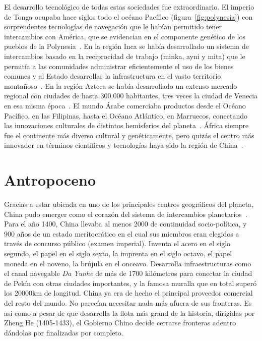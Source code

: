 \documentclass[a4paper,10pt]{book}
\theoremstyle{definition}
\begin{document}
El desarrollo tecnológico de todas estas sociedades fue extraordinario. 
El imperio de Tonga ocupaba hace siglos todo el oc\'eano Pac\'ifico (figura~\ref{fig:polynesia}) con sorprendentes tecnologías de navegación que le habían permitido tener intercambios con América, que se evidencian en el componente genético de los pueblos de la Polynesia~\cite{thorsby2016-polynesiaAmerica, ioannidis2020-polynesiaAmerica}.
En la región Inca se había desarrollado un sistema de intercambios basado en la reciprocidad de trabajo (minka, ayni y mita) que le permitía a las comunidades administrar eficientemente el uso de los bienes comunes y al Estado desarrollar la infrastructura en el vasto territorio montañoso~\cite{murra}.
En la región Azteca se había desarrollado un extenso mercado regional con ciudades de hasta 300.000 habitantes, tres veces la ciudad de Venecia en esa misma época~\cite{www7.uc.cl}. %
El mundo \'Arabe comerciaba productos desde el Océano Pacífico, en las Filipinas, hasta el Oc\'eano Atl\'antico, en Marruecos, conectando las innovaciones culturales de distintos hemisferios del planeta~\cite{dussel}.
África siempre fue el continente más diverso cultural y genéticamente, pero quizás el centro más innovador en términos científicos y tecnologías haya sido la región de China~\cite{needham2004-generalConclusionsAndReflections}.

\section{Antropoceno}

Gracias a estar ubicada en uno de los principales centros geográficos del planeta, China pudo emerger como el corazón del sistema de intercambios planetarios~\cite{pomeranz2000}.
Para el año 1400, China llevaba al menos 2000 de continuidad socio-pol\'itica, y 900 a\~nos de un estado meritocr\'atico en el cual sus miembros eran elegidos a trav\'es de concurso público (examen imperial).
Inventa el acero en el siglo segundo, el papel en el siglo sexto, la imprenta en el siglo octavo, el papel moneda en el noveno, la br\'ujula en el onceavo.
Desarrolla infraestructuras como el canal navegable \emph{Da Yunhe} de más de 1700 kilómetros para conectar la ciudad de Pekín con otras ciudades importantes, y la famosa muralla que en total superó los 20000km de longitud.
China ya era de hecho el principal proveedor comercial del resto del mundo.
No parecían necesitar nada más afuera de sus fronteras.
Es así como a pesar de que desarrolla la flota más grand de la historia, dirigidas por Zheng He (1405-1433), el Gobierno Chino decide cerrarse fronteras adentro dándolas por finalizadas por completo.
\end{document}
